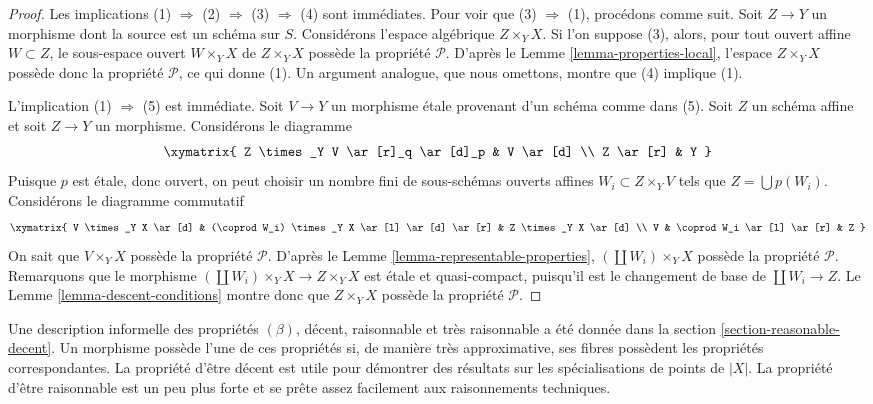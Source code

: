 \begin{proof}
Les implications (1) $\Rightarrow$ (2) $\Rightarrow$ (3) $\Rightarrow$ (4)
sont immédiates.
Pour voir que (3) $\Rightarrow$ (1), procédons comme suit.
Soit $Z \to Y$ un morphisme dont la source est un schéma sur $S$.
Considérons l'espace algébrique $Z \times_Y X$. Si l'on suppose (3), alors,
pour tout ouvert affine $W \subset Z$, le sous-espace ouvert
$W \times_Y X$ de $Z \times_Y X$ possède la propriété $\mathcal{P}$.
D'après le
Lemme \ref{lemma-properties-local},
l'espace $Z \times_Y X$ possède donc la propriété $\mathcal{P}$, ce qui donne
(1). Un argument analogue, que nous omettons, montre que (4) implique (1).

\medskip\noindent
L'implication (1) $\Rightarrow$ (5) est immédiate. Soit $V \to Y$ un morphisme
étale provenant d'un schéma comme dans (5). Soit $Z$ un schéma affine et soit
$Z \to Y$ un morphisme. Considérons le diagramme
$$
\xymatrix{
Z \times_Y V \ar[r]_q \ar[d]_p & V \ar[d] \\
Z \ar[r] & Y
}
$$
Puisque $p$ est étale, donc ouvert, on peut choisir un nombre fini de
sous-schémas ouverts affines $W_i \subset Z \times_Y V$ tels que
$Z = \bigcup p(W_i)$. Considérons le diagramme commutatif
$$
\xymatrix{
V \times_Y X \ar[d] &
(\coprod W_i) \times_Y X \ar[l] \ar[d] \ar[r] &
Z \times_Y X \ar[d] \\
V &
\coprod W_i \ar[l] \ar[r] &
Z
}
$$
On sait que $V \times_Y X$ possède la propriété $\mathcal{P}$. D'après le
Lemme \ref{lemma-representable-properties},
$(\coprod W_i) \times_Y X$ possède la propriété $\mathcal{P}$.
Remarquons que le morphisme
$(\coprod W_i) \times_Y X \to Z \times_Y X$ est étale et quasi-compact,
puisqu'il est le changement de base de $\coprod W_i \to Z$.
Le Lemme \ref{lemma-descent-conditions}
montre donc que $Z \times_Y X$ possède la propriété $\mathcal{P}$.
\end{proof}

\begin{remark}
\label{remark-very-reasonable}
Une description informelle des propriétés $(\beta)$, décent, raisonnable et
très raisonnable a été donnée dans la section \ref{section-reasonable-decent}.
Un morphisme possède l'une de ces propriétés si, de manière très
approximative,
ses fibres possèdent les propriétés correspondantes.
La propriété d'être décent est utile pour démontrer des résultats sur les
spécialisations de points de $|X|$. La propriété d'être raisonnable est un peu
plus forte et se prête assez facilement aux raisonnements techniques.
\end{remark}

